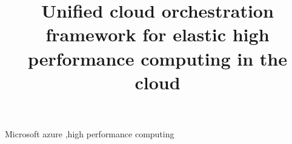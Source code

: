 \documentclass[3p,times]{elsarticle}
\begin{document}
\begin{frontmatter}




\title{Unified cloud orchestration framework for elastic high performance computing in the cloud}



\begin{abstract}


\end{abstract}

\begin{keyword}
Microsoft azure \sep high performance computing



\end{keyword}

\end{frontmatter}
\end{document}
